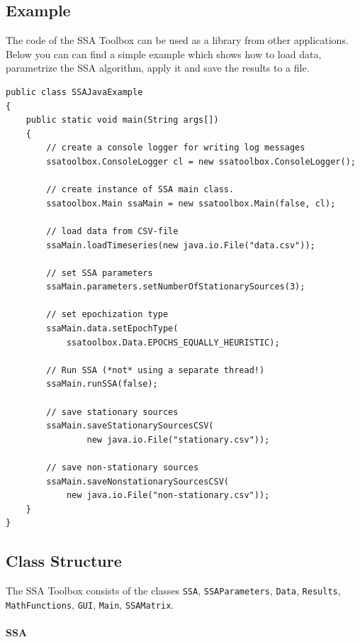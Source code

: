 \documentclass{article}
\newcommand{\1}{\ensuremath{\mathds{1}}}
\newcommand{\0}{\ensuremath{0}}
\begin{document}
\subsection*{Example}

The code of the SSA Toolbox can be used as a library from other applications. Below you can can find a 
simple example which shows how to load data, parametrize the SSA algorithm, apply it and save the
results to a file.
 
\bigskip

\begin{boxedminipage}{12cm}
\small
\begin{verbatim}
public class SSAJavaExample
{
    public static void main(String args[])
    {
        // create a console logger for writing log messages
        ssatoolbox.ConsoleLogger cl = new ssatoolbox.ConsoleLogger();

        // create instance of SSA main class.
        ssatoolbox.Main ssaMain = new ssatoolbox.Main(false, cl);

        // load data from CSV-file
        ssaMain.loadTimeseries(new java.io.File("data.csv"));

        // set SSA parameters 
        ssaMain.parameters.setNumberOfStationarySources(3);

        // set epochization type
        ssaMain.data.setEpochType(
        	ssatoolbox.Data.EPOCHS_EQUALLY_HEURISTIC);

        // Run SSA (*not* using a separate thread!)
        ssaMain.runSSA(false);

        // save stationary sources
        ssaMain.saveStationarySourcesCSV(
        		new java.io.File("stationary.csv"));

        // save non-stationary sources
        ssaMain.saveNonstationarySourcesCSV(
        	new java.io.File("non-stationary.csv"));
    }
}
\end{verbatim}
\end{boxedminipage}


\subsection*{Class Structure}

The SSA Toolbox consists of the classes \texttt{SSA}, \texttt{SSAParameters}, \texttt{Data}, \texttt{Results}, \texttt{MathFunctions}, 
\texttt{GUI}, \texttt{Main}, \texttt{SSAMatrix}.

\paragraph{SSA} 
\end{document}
